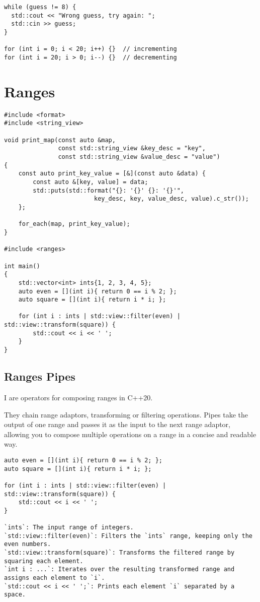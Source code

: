\begin{verbatim}
while (guess != 8) {
  std::cout << "Wrong guess, try again: ";
  std::cin >> guess;
}

for (int i = 0; i < 20; i++) {}  // incrementing
for (int i = 20; i > 0; i--) {}  // decrementing
\end{verbatim}

\section{Ranges}

\begin{verbatim}
#include <format>
#include <string_view>

void print_map(const auto &map,
               const std::string_view &key_desc = "key",
               const std::string_view &value_desc = "value")
{
    const auto print_key_value = [&](const auto &data) { 
        const auto &[key, value] = data;
        std::puts(std::format("{}: '{}' {}: '{}'",
                         key_desc, key, value_desc, value).c_str());
    };

    for_each(map, print_key_value);
}

#include <ranges>

int main()
{
    std::vector<int> ints{1, 2, 3, 4, 5};
    auto even = [](int i){ return 0 == i % 2; };
    auto square = [](int i){ return i * i; };
                                              
    for (int i : ints | std::view::filter(even) | std::view::transform(square)) {
        std::cout << i << ' ';
    }
}
\end{verbatim}

\subsection{Ranges Pipes}

I are operators for composing ranges in C++20.

They chain range adaptors, transforming or filtering operations.
Pipes take the output of one range and passes it as the input to the next range adaptor,
allowing you to compose multiple operations on a range in a concise and readable way.

\begin{verbatim}
auto even = [](int i){ return 0 == i % 2; };
auto square = [](int i){ return i * i; };

for (int i : ints | std::view::filter(even) | std::view::transform(square)) {
    std::cout << i << ' ';
}

`ints`: The input range of integers.
`std::view::filter(even)`: Filters the `ints` range, keeping only the even numbers.
`std::view::transform(square)`: Transforms the filtered range by squaring each element.
`int i : ...`: Iterates over the resulting transformed range and assigns each element to `i`.
`std::cout << i << ' ';`: Prints each element `i` separated by a space.
\end{verbatim}

